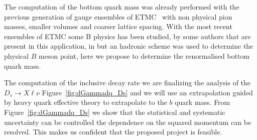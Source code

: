 
The computation of the bottom quark mass was already performed with
the previous generation of gauge ensembles of ETMC~\cite{ETM:2016nbo,ETM:2011zey} with
non physical pion masses, smaller volumes and coarser lattice spacing.
With the most recent ensembles of ETMC some B physics has been studied, by some authors
that are present in this application, in \cite{Frezzotti:2024kqk}
but an hadronic scheme was used to determine the physical $B$ meson point, here we propose to 
determine the renormalised bottom quark mass.   


The computation of the   inclusive decay rate we are finalizing the
analysis of the $D_s\to X \ell \nu$ Figure~\ref{fig:dGammadq_Ds} and
we will use an extrapolation guided by heavy quark effective theory to extrapolate
to the $b$ quark mass.
From  Figure~\ref{fig:dGammadq_Ds} we show that the statistical and systematic
uncertainty can be controlled  the
dependence on the squared momentum can be resolved. This makes us
confident that the proposed project is feasible.

\endinput
